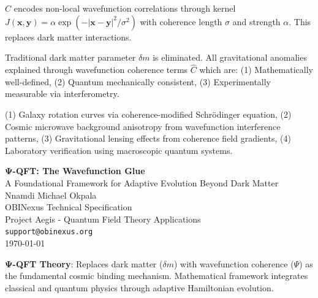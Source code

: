 \documentclass{article}
\makeatletter
\providecommand{\set@TestablePredictions}[1]{\def\TestablePredictionsContent{#1}}
\makeatother
\begin{document}
\begin{tcolorbox}[colback=blue!5!white,colframe=blue!75!black,title=Coherence Operator]
$\hat{C}$ encodes non-local wavefunction correlations through kernel $J(\mathbf{x},\mathbf{y}) = \alpha \exp(-|\mathbf{x}-\mathbf{y}|^2/\sigma^2)$ with coherence length $\sigma$ and strength $\alpha$. This replaces dark matter interactions.


Traditional dark matter parameter $\delta m$ is eliminated. All gravitational anomalies explained through wavefunction coherence terms $\hat{C}$ which are: (1) Mathematically well-defined, (2) Quantum mechanically consistent, (3) Experimentally measurable via interferometry.




(1) Galaxy rotation curves via coherence-modified Schrödinger equation, (2) Cosmic microwave background anisotropy from wavefunction interference patterns, (3) Gravitational lensing effects from coherence field gradients, (4) Laboratory verification using macroscopic quantum systems.




\begin{center}
{\Huge\bfseries Ψ-QFT: The Wavefunction Glue}\\[8pt]
{\Large A Foundational Framework for Adaptive Evolution Beyond Dark Matter}\\[12pt]
{\large Nnamdi Michael Okpala}\\[4pt]
{\normalsize OBINexus Technical Specification}\\[4pt]
{\normalsize Project Aegis - Quantum Field Theory Applications}\\[4pt]
{\small \texttt{support@obinexus.org}}\\[8pt]
{\small \today}
\end{center}

\vspace{12pt}

\begin{tcolorbox}[title={Executive Summary - OBINexus Framework},obinexus]
\textbf{Ψ-QFT Theory}: Replaces dark matter ($\delta m$) with wavefunction coherence ($\Psi$) as the fundamental cosmic binding mechanism. Mathematical framework integrates classical and quantum physics through adaptive Hamiltonian evolution.


\end{tcolorbox}
\end{tcolorbox}
\end{document}
